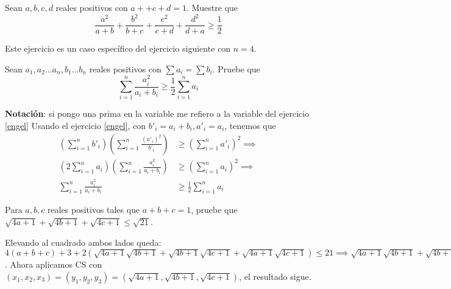 \begin{ejer}
	Sean $a, b, c, d$ reales positivos con $a++c+d = 1$. Muestre que
	\begin{equation}
	 \frac{a^{2}}{a+b} +\frac{b^{2}}{b+c} +\frac{c^{2}}{c+d} +\frac{d^{2}}{d+a} \geq \frac{1}{2}
	\end{equation}
\end{ejer}
\begin{sol}
	Este ejercicio es un caso espec\'ifico del ejercicio siguiente con $n =4$.
\end{sol}

\begin{ejer}
	Sean $a_{1}, a_{2} \dots a_{n}, b_{1} \dots b_{n}$ reales positivos con $\sum a_{i} = \sum b_{i}$. Pruebe que
	\begin{equation}
	\sum_{i= 1}^{n} \frac{a_{i}^{2}}{a_{i} + b_{i}} \geq \frac{1}{2} \sum_{i=1}^{n} a_{i}
	\end{equation}
\end{ejer}

\begin{sol}
	\textbf{Notaci\'on}: si pongo una prima en la variable me refiero a la variable del ejercicio \ref{engel}
	Usando el ejercicio \ref{engel}, con $b'_{i} = a_{i} +b_{i}, a'_{i} = a_{i}$, tenemos que
	\begin{align}
		 \left(\sum_{i=1}^{n} b'_{i}\right)\left(\sum_{i=1}^{n} \frac{\left(a'_{i}\right)^{2}}{b'_{i}}\right)&\geq \left(\sum_{i=1}^{n} a'_{i}\right)^{2}  \implies \\		 
		 \left(2\sum_{i=1}^{n} a_{i}\right)\left(\sum_{i=1}^{n} \frac{a_{i}^{2}}{a_{i} + b_{i}}\right)&\geq \left(\sum_{i=1}^{n} a_{i}\right)^{2} \implies \\
		 \sum_{i=1}^{n} \frac{a_{i}^{2}}{a_{i} + b_{i}} &\geq \frac{1}{2}\sum_{i=1}^{n} a_{i}
	\end{align}
\end{sol}

\begin{ejer}
		Para $a,b,c$ reales positivos tales que $a+b+c=1$, pruebe que $\sqrt{4a+1}+\sqrt{4b+1}+\sqrt{4c+1} \leq \sqrt{21}$.
\end{ejer}

\begin{sol}
	Elevando al cuadrado ambos lados queda: $4(a+b+c) + 3 + 2(\sqrt{4a+1}\sqrt{4b+1}+\sqrt{4b+1}\sqrt{4c+1}+\sqrt{4a+1}\sqrt{4c+1}) \leq 21 \implies \sqrt{4a+1}\sqrt{4b+1}+\sqrt{4b+1}\sqrt{4c+1}+\sqrt{4a+1}\sqrt{4c+1} \leq 7$. Ahora aplicamos CS con $(x_{1}, x_{2}, x_{3}) = (y_{1}, y_{2}, y_{3}) = (\sqrt{4a+1}, \sqrt{4b+1}, \sqrt{4c+1})$, el resultado sigue.
\end{sol}

